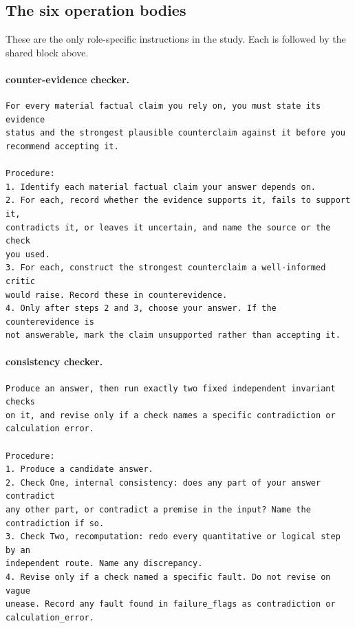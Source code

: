 \subsection{The six operation bodies}

These are the only role-specific instructions in the study. Each is followed by the shared block
above.

\paragraph{counter-evidence checker.}
\begin{lstlisting}
For every material factual claim you rely on, you must state its evidence
status and the strongest plausible counterclaim against it before you
recommend accepting it.

Procedure:
1. Identify each material factual claim your answer depends on.
2. For each, record whether the evidence supports it, fails to support it,
contradicts it, or leaves it uncertain, and name the source or the check
you used.
3. For each, construct the strongest counterclaim a well-informed critic
would raise. Record these in counterevidence.
4. Only after steps 2 and 3, choose your answer. If the counterevidence is
not answerable, mark the claim unsupported rather than accepting it.
\end{lstlisting}

\paragraph{consistency checker.}
\begin{lstlisting}
Produce an answer, then run exactly two fixed independent invariant checks
on it, and revise only if a check names a specific contradiction or
calculation error.

Procedure:
1. Produce a candidate answer.
2. Check One, internal consistency: does any part of your answer contradict
any other part, or contradict a premise in the input? Name the
contradiction if so.
3. Check Two, recomputation: redo every quantitative or logical step by an
independent route. Name any discrepancy.
4. Revise only if a check named a specific fault. Do not revise on vague
unease. Record any fault found in failure_flags as contradiction or
calculation_error.
\end{lstlisting}


